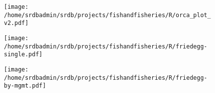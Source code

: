 \begin{landscape}

\begin{figure}
\begin{center}
\texttt{[image: /home/srdbadmin/srdb/projects/fishandfisheries/R/orca\_plot\_v2.pdf]}
\end{center}
\caption{ }\label{fig:orca}
\end{figure}
\end{landscape}

\begin{figure}
\begin{center}
\texttt{[image: /home/srdbadmin/srdb/projects/fishandfisheries/R/friedegg-single.pdf]}
\end{center}
\caption{ }\label{fig:friedegg}
\end{figure}

\begin{figure}
\begin{center}
\texttt{[image: /home/srdbadmin/srdb/projects/fishandfisheries/R/friedegg-by-mgmt.pdf]}
\end{center}
\caption{ }\label{fig:friedeggmgmt}
\end{figure}

